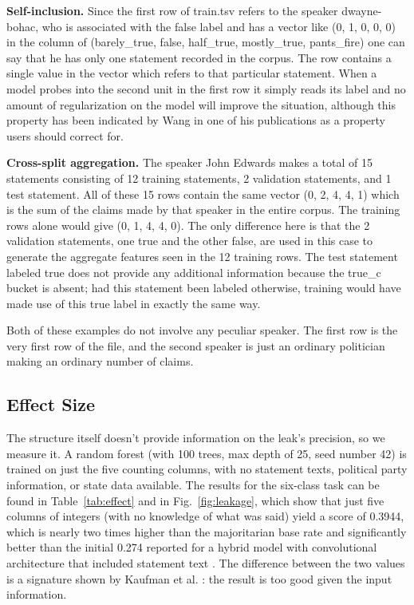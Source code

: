 \textbf{Self-inclusion.} Since the first row of train.tsv refers to the speaker dwayne-bohac, who is associated with the false label and has a vector like (0, 1, 0, 0, 0) in the column of (barely\_true, false, half\_true, mostly\_true, pants\_fire) one can say that he has only one statement recorded in the corpus. The row contains a single value in the vector which refers to that particular statement. When a model probes into the second unit in the first row it simply reads its label and no amount of regularization on the model will improve the situation, although this property has been indicated by Wang in one of his publications as a property users should correct for.

\textbf{Cross-split aggregation.} The speaker John Edwards makes a total of 15 statements consisting of 12 training statements, 2 validation statements, and 1 test statement. All of these 15 rows contain the same vector (0, 2, 4, 4, 1) which is the sum of the claims made by that speaker in the entire corpus. The training rows alone would give (0, 1, 4, 4, 0). The only difference here is that the 2 validation statements, one true and the other false, are used in this case to generate the aggregate features seen in the 12 training rows. The test statement labeled true does not provide any additional information because the true\_c bucket is absent; had this statement been labeled otherwise, training would have made use of this true label in exactly the same way.

Both of these examples do not involve any peculiar speaker. The first row is the very first row of the file, and the second speaker is just an ordinary politician making an ordinary number of claims.

\subsection{Effect Size}

The structure itself doesn't provide information on the leak's precision, so we measure it. A random forest (with 100 trees, max depth of 25, seed number 42) is trained on just the five counting columns, with no statement texts, political party information, or state data available. The results for the six-class task can be found in Table~\ref{tab:effect} and in Fig.~\ref{fig:leakage}, which show that just five columns of integers (with no knowledge of what was said) yield a score of 0.3944, which is nearly two times higher than the majoritarian base rate and significantly better than the initial 0.274 reported for a hybrid model with convolutional architecture that included statement text \cite{wang2017liar}. The difference between the two values is a signature shown by Kaufman et al. \cite{kaufman2012leakage}: the result is too good given the input information.

